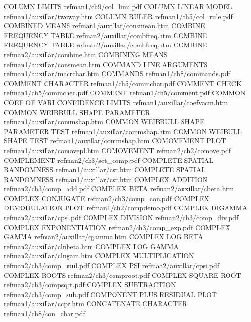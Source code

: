 COLUMN LIMITS                           refman1/ch9/col_limi.pdf
COLUMN LINEAR MODEL                     refman1/auxillar/twoway.htm
COLUMN RULER                            refman1/ch5/col_rule.pdf
COMBINED MEANS                          refman1/auxillar/consmean.htm
COMBINE FREQUENCY TABLE                 refman2/auxillar/combfreq.htm
COMBINE FREQUENCY TABLE                 refman2/auxillar/combfreq.htm
COMBINE                                 refman2/auxillar/combine.htm
COMBINING MEANS                         refman1/auxillar/consmean.htm
COMMAND LINE ARGUMENTS                  refman1/auxillar/macrchar.htm
COMMANDS                                refman1/ch8/commands.pdf
COMMENT CHARACTER                       refman1/ch5/commchar.pdf
COMMENT CHECK                           refman1/ch5/commchec.pdf
COMMENT                                 refman1/ch5/comment.pdf
COMMON COEF OF VARI CONFIDENCE LIMITS   refman1/auxillar/coefvacm.htm
COMMON WEIBBULL SHAPE PARAMETER         refman1/auxillar/commshap.htm
COMMON WEIBBULL SHAPE PARAMETER TEST    refman1/auxillar/commshap.htm
COMMON WEIBULL SHAPE TEST               refman1/auxillar/commshap.htm
COMOVEMENT PLOT                         refman1/auxillar/comovepl.htm
COMOVEMENT                              refman2/ch2/comove.pdf
COMPLEMENT                              refman2/ch3/set_comp.pdf
COMPLETE SPATIAL RANDOMNESS             refman1/auxillar/csr.htm
COMPLETE SPATIAL RANDOMNESS             refman1/auxillar/csr.htm
COMPLEX ADDITION                        refman2/ch3/comp_add.pdf
COMPLEX BETA                            refman2/auxillar/cbeta.htm
COMPLEX CONJUGATE                       refman2/ch3/comp_con.pdf
COMPLEX DEMODULATION PLOT               refman1/ch2/compdemo.pdf
COMPLEX DIGAMMA                         refman2/auxillar/cpsi.pdf
COMPLEX DIVISION                        refman2/ch3/comp_div.pdf
COMPLEX EXPONENTIATION                  refman2/ch3/comp_exp.pdf
COMPLEX GAMMA                           refman2/auxillar/cgamma.htm
COMPLEX LOG BETA                        refman2/auxillar/clnbeta.htm
COMPLEX LOG GAMMA                       refman2/auxillar/clngam.htm
COMPLEX MULTIPLICATION                  refman2/ch3/comp_mul.pdf
COMPLEX PSI                             refman2/auxillar/cpsi.pdf
COMPLEX ROOTS                           refman2/ch3/comproot.pdf
COMPLEX SQUARE ROOT                     refman2/ch3/compsqrt.pdf
COMPLEX SUBTRACTION                     refman2/ch3/comp_sub.pdf
COMPONENT PLUS RESIDUAL PLOT            refman1/auxillar/ccpr.htm
CONCATENATE CHARACTER                   refman1/ch8/con_char.pdf

